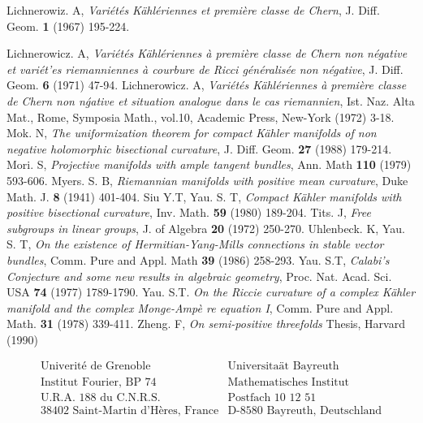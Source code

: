 \begin{thebibliography}{99}
 Lichnerowiz. A, \textit{Vari\'et\'es K\"ahl\'eriennes et premi\`ere classe de Chern}, J. Diff. Geom. {\bf 1} (1967) 195-224.
 
  Lichnerowicz. A, \textit{Vari\'et\'es K\"ahl\'eriennes \`a premi\`ere classe de Chern non n\'egative et vari\'et'es riemanniennes \`a courbure de Ricci g\'en\'eralis\'ee non n\'egative}, J. Diff. Geom. {\bf 6} (1971) 47-94.
  Lichnerowicz. A, \textit{Vari\'et\'es K\"ahl\'eriennes \`a premi\`ere classe de Chern non n\'gative et situation analogue dans le cas riemannien}, Ist. Naz. Alta Mat., Rome, Symposia Math., vol.10, Academic Press, New-York (1972) 3-18.
  Mok. N, \textit{The uniformization theorem for compact K\"ahler manifolds of non negative holomorphic bisectional curvature}, J. Diff. Geom. {\bf 27} (1988) 179-214.
  Mori. S, \textit{Projective manifolds with ample tangent bundles}, Ann. Math {\bf 110} (1979) 593-606.
  Myers. S. B, \textit{Riemannian manifolds with positive mean curvature}, Duke Math. J. {\bf 8} (1941) 401-404.
  Siu Y.T, Yau. S. T, \textit{Compact K\"ahler manifolds with positive bisectional curvature}, Inv. Math. {\bf 59} (1980) 189-204.
   Tits. J, \textit{Free subgroups in linear groups}, J. of Algebra {\bf 20} (1972) 250-270.
  Uhlenbeck. K, Yau. S. T, \textit{On the existence of Hermitian-Yang-Mills connections in stable vector bundles}, Comm. Pure and Appl. Math {\bf 39} (1986) 258-293.
  Yau. S.T, \textit{Calabi's Conjecture and some new results in algebraic geometry}, Proc. Nat. Acad. Sci. USA {\bf 74} (1977) 1789-1790.
  Yau. S.T. \textit{On the Riccie curvature of a complex K\"ahler manifold and the complex Monge-Amp\`e re equation I}, Comm. Pure and Appl. Math. {\bf 31} (1978) 339-411.
  Zheng. F, \textit{On semi-positive threefolds} Thesis, Harvard (1990)
\end{thebibliography}


\medskip
$$
\begin{array}{ll}
\text{Univerit\'e de Grenoble} &  \text{Universita\"at Bayreuth}\\
\text{Institut Fourier, BP 74} &  \text{Mathematisches Institut}\\
\text{U.R.A. 188 du C.N.R.S.} & \text{Postfach 10 12 51}\\
\text{38402 Saint-Martin d'H\`eres, France} & \text{D-8580 Bayreuth, Deutschland}\\
\end{array}
$$
